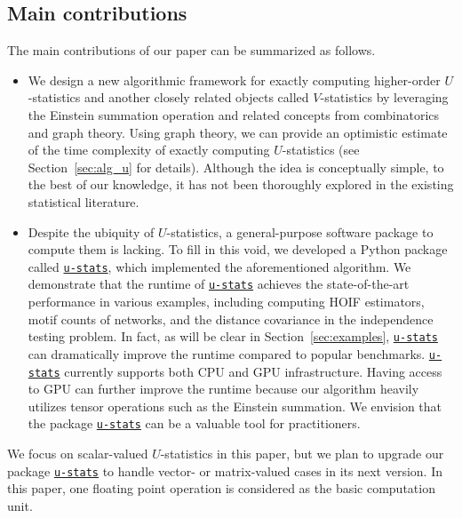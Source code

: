 \documentclass[letterpaper,11pt]{article}
\newcommand{\libref}[2]{\href{#2}{\texttt{#1}}}
\def\package{\libref{u-stats}{https://github.com/zrq1706/U-Statistics-Python}}
\begin{document}
\begin{bibunit}[plainnat]
\subsection*{Main contributions}


The main contributions of our paper can be summarized as follows.

\begin{itemize}
\item We design a new algorithmic framework for exactly computing higher-order $U$-statistics and another closely related objects called $V$-statistics by leveraging the Einstein summation operation and related concepts from combinatorics and graph theory. Using graph theory, we can provide an optimistic estimate of the time complexity of exactly computing $U$-statistics (see Section~\ref{sec:alg_u} for details). Although the idea is conceptually simple, to the best of our knowledge, it has not been thoroughly explored in the existing statistical literature.

\item Despite the ubiquity of $U$-statistics, a general-purpose software package to compute them is lacking. To fill in this void, we developed a Python package called \package{}, which implemented the aforementioned algorithm. We demonstrate that the runtime of \package{} achieves the state-of-the-art performance in various examples, including computing HOIF estimators, motif counts of networks, and the distance covariance in the independence testing problem. In fact, as will be clear in Section~\ref{sec:examples}, \package{} can dramatically improve the runtime compared to popular benchmarks. \package{} currently supports both CPU and GPU infrastructure. Having access to GPU can further improve the runtime because our algorithm heavily utilizes tensor operations such as the Einstein summation. We envision that the package \package{} can be a valuable tool for practitioners.
\end{itemize}

\begin{remark}
\label{rem:misc}
We focus on scalar-valued $U$-statistics in this paper, but we plan to upgrade our package \package{} to handle vector- or matrix-valued cases in its next version. In this paper, one floating point operation is considered as the basic computation unit.
\end{remark}




\end{bibunit}
\end{document}
